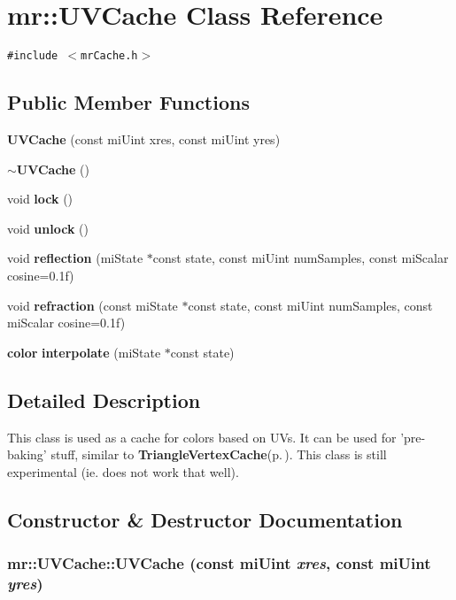 \section{mr::UVCache Class Reference}
\label{classmr_1_1UVCache}
{\tt \#include $<$mr\-Cache.h$>$}

\subsection*{Public Member Functions}
\begin{CompactItemize}
\item 
{\bf UVCache} (const mi\-Uint xres, const mi\-Uint yres)
\item 
{\bf $\sim$UVCache} ()
\item 
void {\bf lock} ()
\item 
void {\bf unlock} ()
\item 
void {\bf reflection} (mi\-State $\ast$const state, const mi\-Uint num\-Samples, const mi\-Scalar cosine=0.1f)
\item 
void {\bf refraction} (const mi\-State $\ast$const state, const mi\-Uint num\-Samples, const mi\-Scalar cosine=0.1f)
\item 
{\bf color} {\bf interpolate} (mi\-State $\ast$const state)
\end{CompactItemize}


\subsection{Detailed Description}
This class is used as a cache for colors based on UVs. It can be used for 'pre-baking' stuff, similar to {\bf Triangle\-Vertex\-Cache}{\rm (p.\,\pageref{classmr_1_1TriangleVertexCache})}. This class is still experimental (ie. does not work that well). 



\subsection{Constructor \& Destructor Documentation}
\subsubsection{\setlength{\rightskip}{0pt plus 5cm}mr::UVCache::UVCache (const mi\-Uint {\em xres}, const mi\-Uint {\em yres})\hspace{0.3cm}{\tt  [inline]}}\label{classmr_1_1UVCache_a0}



